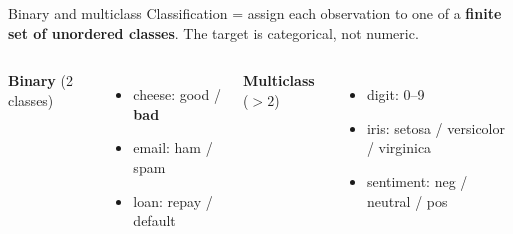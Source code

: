 \documentclass[aspectratio=169]{beamer}
\begin{document}
\begin{frame}{Binary and multiclass}
  Classification = assign each observation to one of a \textbf{finite set of unordered
  classes}. The target is categorical, not numeric.
  \vfill
  \begin{columns}[T]
    \textbf{Binary} (2 classes)
    \begin{itemize}\small
      \item cheese: good / \textbf{bad}
      \item email: ham / spam
      \item loan: repay / default
    \end{itemize}
    \textbf{Multiclass} ($> 2$)
    \begin{itemize}\small
      \item digit: 0--9
      \item iris: setosa / versicolor / virginica
      \item sentiment: neg / neutral / pos
    \end{itemize}
  \end{columns}
  \vfill
\end{frame}
\end{document}
